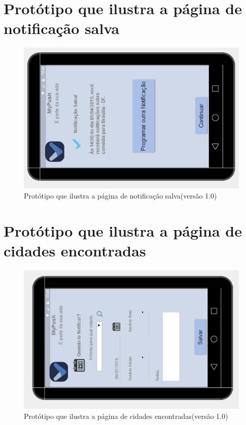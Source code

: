 \begin{apendicesenv}
      \section*{Protótipo que ilustra a página de notificação salva}

    \begin{figure}[!htbp]
      \centering
      \includegraphics[scale=0.5, angle=-90]{editaveis/figuras/prototipo_alta_fidelidade_v1/1_5}
      \caption{Protótipo que ilustra a página de notificação salva(versão 1.0)}
      \label{v1}
    \end{figure}
    
      \section*{Protótipo que ilustra a página de cidades encontradas}

    \begin{figure}[!htbp]
      \centering
      \includegraphics[scale=0.5, angle=-90]{editaveis/figuras/prototipo_alta_fidelidade_v1/1_6}
      \caption{Protótipo que ilustra a página de cidades encontradas(versão 1.0)}
      \label{v1}
    \end{figure}
    

\end{apendicesenv}
